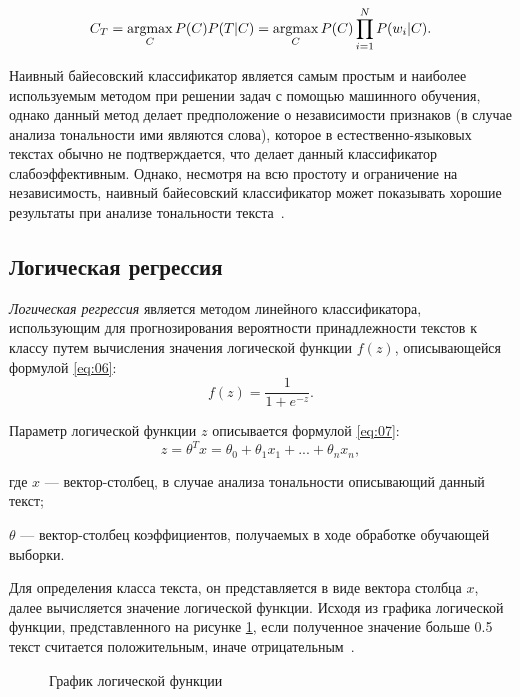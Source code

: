\begin{equation}\label{eq:06}
    C_T = \operatorname*{argmax}_C P(C)P(T|C) = \operatorname*{argmax}_C P(C)\prod\limits_{i=1}^{N} P(w_i|C).
\end{equation}

Наивный байесовский классификатор является самым простым и наиболее
используемым методом при решении задач с помощью машинного обучения,
однако данный метод делает предположение о независимости признаков (в случае
анализа тональности ими являются слова), которое в естественно-языковых текстах
обычно не подтверждается, что делает данный классификатор слабоэффективным.
Однако, несмотря на всю простоту и ограничение на независимость, наивный
байесовский классификатор может показывать хорошие результаты при анализе
тональности текста~\cite{article9}.

\subsection{Логическая регрессия}

\textit{Логическая регрессия} является методом линейного классификатора,
использующим для прогнозирования вероятности принадлежности текстов к классу
путем вычисления значения логической функции $f(z)$, описывающейся формулой
\ref{eq:06}:
\begin{equation}\label{eq:06}
    f(z) = \frac{1}{1+e^{-z}}.
\end{equation}

Параметр логической функции $z$ описывается формулой \ref{eq:07}:
\begin{equation}\label{eq:07}
    z = \theta^Tx=\theta_0+\theta_1x_1+...+\theta_nx_n,
\end{equation}

где $x$ --- вектор-столбец, в случае анализа тональности описывающий данный
текст;

$\theta$ --- вектор-столбец коэффициентов, получаемых в ходе обработке
обучающей выборки.

Для определения класса текста, он представляется в виде вектора столбца $x$,
далее вычисляется значение логической функции. Исходя из графика логической
функции, представленного на рисунке \ref{img:01}, если полученное значение
больше 0.5 текст считается положительным, иначе отрицательным~\cite{article22}.

\begin{figure}[h!]
    \begin{center}
    \end{center}
    \caption{График логической функции}\label{img:01}
\end{figure}

